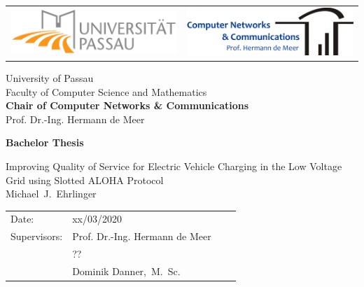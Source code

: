 \documentclass[fontsize=12pt,openright,twoside,paper=a4,BCOR=1cm]{scrbook}
\newcommand{\authornamefirst}{Michael}
\newcommand{\authornamemiddle}{J.}
\newcommand{\authornamelast}{Ehrlinger}
\newcommand{\worktitle}{Improving Quality of Service for Electric Vehicle Charging in the Low Voltage Grid using Slotted ALOHA Protocol}
\newcommand{\thesistype}{Bachelor Thesis}
\newcommand{\thesisdate}{xx/03/2020}
\newcommand{\thesisprof}{Prof. Dr.-Ing. Hermann de Meer}
\newcommand{\thesissecondprof}{??}
\newcommand{\supervisor}{Dominik Danner,~M.~Sc.}
\newcommand{\chair}{Chair of Computer Networks \& Communications}
\begin{document}
\thispagestyle{empty}
\newpage

\vspace{1cm}

\begin{center}
\begin{tabular}{lr}
\includegraphics[width=6.5cm]{img/logouni.pdf}
&
\includegraphics[width=6.5cm]{img/logochair.pdf}
\end{tabular}

\vspace{3cm}
\Large University of Passau
\\
\Large Faculty of Computer Science and Mathematics
\\
\vspace{0.3cm}
\Large {\bf \chair }
\\
\Large \thesisprof

\end{center}


\vspace{4.5cm}

\begin{center}
        {\bf\Huge \thesistype} %
\end{center}

\begin{center}
        \settowidth{\baselineskip}{0.4cm}
        {\LARGE \worktitle}
        \\
        {\Large
        \authornamefirst~\authornamemiddle~\authornamelast
        }
\end{center}

\vfill {%

\vfill


{\large
\begin{tabular}[l]{llll}

Date:       & \thesisdate %
\smallskip \\
Supervisors:   & \thesisprof \\
&\thesissecondprof \\
	& \supervisor \\
\end{tabular}}
} \cleardoublepage
\end{document}
